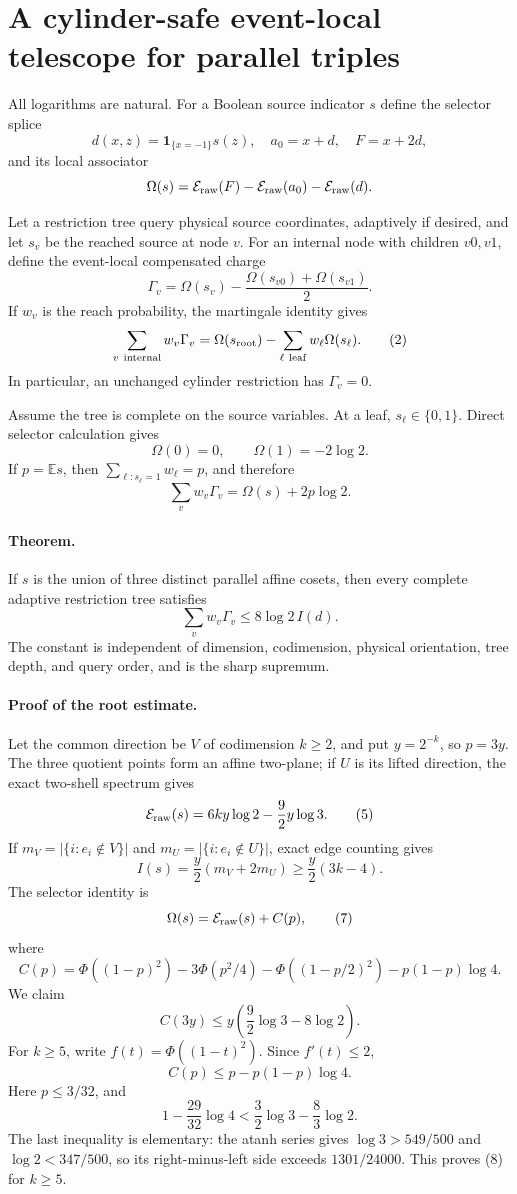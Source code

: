 \section*{A cylinder-safe event-local telescope for parallel triples}

All logarithms are natural.  For a Boolean source indicator $s$ define the
selector splice
\[
 d(x,z)=\mathbf1_{\{x=-1\}}s(z),\quad a_0=x+d,\quad F=x+2d,
\]
and its local associator
\[
 \Omega(s)=\mathcal E_{\rm raw}(F)
 -\mathcal E_{\rm raw}(a_0)-\mathcal E_{\rm raw}(d).
\]

Let a restriction tree query physical source coordinates, adaptively if
desired, and let $s_v$ be the reached source at node $v$.  For an internal
node with children $v0,v1$, define the event-local compensated charge
\[
 \Gamma_v=\Omega(s_v)-\frac{\Omega(s_{v0})+\Omega(s_{v1})}{2}. \tag{1}
\]
If $w_v$ is the reach probability, the martingale identity gives
\[
 \sum_{v\ {\rm internal}}w_v\Gamma_v
 =\Omega(s_{\rm root})-\sum_{\ell\ {\rm leaf}}w_\ell\Omega(s_\ell).
                                                                    \tag{2}
\]
In particular, an unchanged cylinder restriction has $\Gamma_v=0$.

Assume the tree is complete on the source variables.  At a leaf,
$s_\ell\in\{0,1\}$.  Direct selector calculation gives
\[
 \Omega(0)=0,\qquad \Omega(1)=-2\log2.
\]
If $p=\mathbb E s$, then $\sum_{\ell:s_\ell=1}w_\ell=p$, and therefore
\[
 \sum_vw_v\Gamma_v=\Omega(s)+2p\log2.                \tag{3}
\]

\paragraph{Theorem.}
If $s$ is the union of three distinct parallel affine cosets, then every
complete adaptive restriction tree satisfies
\[
 \boxed{\sum_vw_v\Gamma_v\le8\log2\,I(d).}          \tag{4}
\]
The constant is independent of dimension, codimension, physical orientation,
tree depth, and query order, and is the sharp supremum.

\paragraph{Proof of the root estimate.}
Let the common direction be $V$ of codimension $k\ge2$, and put
$y=2^{-k}$, so $p=3y$.  The three quotient points form an affine two-plane;
if $U$ is its lifted direction, the exact two-shell spectrum gives
\[
 \mathcal E_{\rm raw}(s)=6ky\log2-\frac92y\log3.     \tag{5}
\]
If $m_V=|\{i:e_i\notin V\}|$ and
$m_U=|\{i:e_i\notin U\}|$, exact edge counting gives
\[
 I(s)=\frac y2(m_V+2m_U)\ge\frac y2(3k-4).             \tag{6}
\]
The selector identity is
\[
 \Omega(s)=\mathcal E_{\rm raw}(s)+C(p),               \tag{7}
\]
where
\[
 C(p)=\Phi((1-p)^2)-3\Phi(p^2/4)-\Phi((1-p/2)^2)
      -p(1-p)\log4.
\]
We claim
\[
 C(3y)\le y\left(\frac92\log3-8\log2\right).        \tag{8}
\]
For $k\ge5$, write $f(t)=\Phi((1-t)^2)$.  Since $f'(t)\le2$,
\[
 C(p)\le p-p(1-p)\log4.
\]
Here $p\le3/32$, and
\[
 1-\frac{29}{32}\log4
 <\frac32\log3-\frac83\log2.
\]
The last inequality is elementary: the atanh series gives
$\log3>549/500$ and $\log2<347/500$, so its right-minus-left side exceeds
$1301/24000$.  This proves (8) for $k\ge5$.

